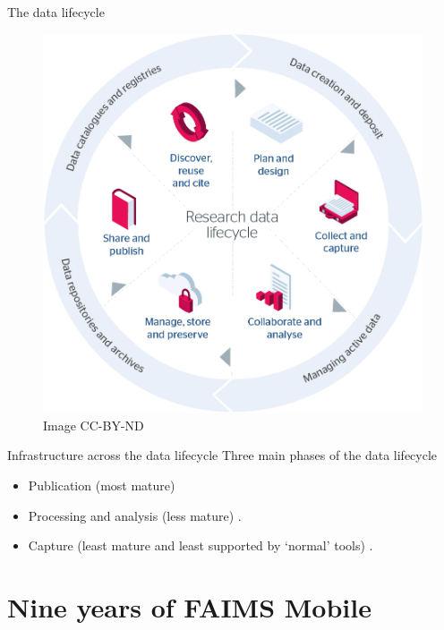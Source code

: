 \documentclass[aspectratio=169, 12pt]{beamer} %
\begin{document}
\begin{frame}{The data lifecycle}
 \begin{figure}[H]
    \centering
        \includegraphics[height=.75\textheight]{figures/research-data-life-diagram.png}
        \caption{\cite{Jisc2018-gx} Image CC-BY-ND}
        \label{fig:figure9}
 \end{figure}
\end{frame}

\begin{frame}{Infrastructure across the data lifecycle}
    Three main phases of the data lifecycle
    \begin{itemize}[label=\textbullet]
        \item Publication (most mature)
        \item Processing and analysis (less mature) \cite{Stewart_Lowndes2017-lj} \cite{Alveo2019-tk}.
        \item Capture (least mature and least supported by `normal' tools) \cite{Bureau_of_Reclamation2017-xl}.
    \end{itemize}
\end{frame}


\section{Nine years of FAIMS Mobile}
\end{document}
